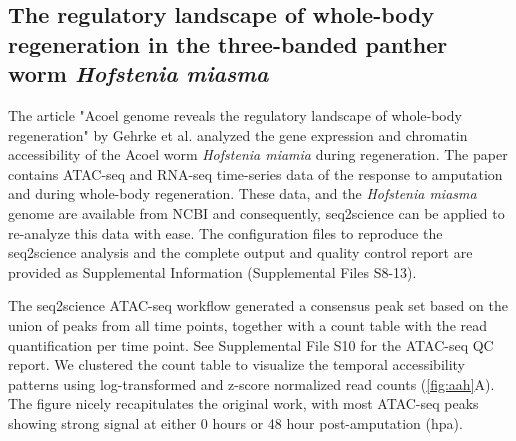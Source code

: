 \subsection{The regulatory landscape of whole-body regeneration in the three-banded panther worm \textit{Hofstenia miasma}}

The article "Acoel genome reveals the regulatory landscape of whole-body regeneration" by Gehrke et al. analyzed the gene expression and chromatin accessibility of the Acoel worm \textit{Hofstenia miamia} \cite{Gehrke2019} during regeneration. The paper contains ATAC-seq and RNA-seq time-series data of the response to amputation and during whole-body regeneration. These data, and the \textit{Hofstenia miasma} genome are available from NCBI and consequently, seq2science can be applied to re-analyze this data with ease. The configuration files to reproduce the seq2science analysis and the complete output and quality control report are provided as Supplemental Information (Supplemental Files S8-13).

The seq2science ATAC-seq workflow generated a consensus peak set based on the union of peaks from all time points, together with a count table with the read quantification per time point. See Supplemental File S10 for the ATAC-seq QC report. We clustered the count table to visualize the temporal accessibility patterns using log-transformed and z-score normalized read counts (\autoref{fig:aah}A). The figure nicely recapitulates the original work, with most ATAC-seq peaks showing strong signal at either 0 hours or 48 hour post-amputation (hpa).

